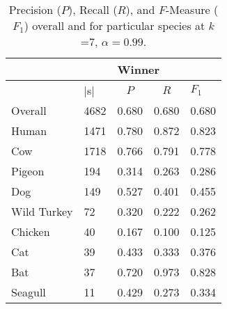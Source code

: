 \begin{table}[t]
\caption{Precision ($P$), Recall ($R$), and $F$-Measure ($F_1$) overall and for particular species at $k$=7, $\alpha=0.99$.}
\label{tab:profile099}
\begin{tabular}{lllll}
\cline{3-5}
                                  & \multicolumn{1}{l|}{}           & \multicolumn{3}{l|}{Winner}                \\ \hline
\multicolumn{1}{|l|}{\Spec{}} & \multicolumn{1}{l|}{$|$\Isol{}s$|$} & \multicolumn{1}{c|}{$P$}   & \multicolumn{1}{c|}{$R$}   & \multicolumn{1}{l|}{$F_1$} \\ \hline
\multicolumn{1}{|l|}{Overall}     & \multicolumn{1}{l|}{4682}            & 0.680 & 0.680 & \multicolumn{1}{l|}{0.680} \\
\multicolumn{1}{|l|}{Human}       & \multicolumn{1}{l|}{1471}            & 0.780 & 0.872 & \multicolumn{1}{l|}{0.823} \\
\multicolumn{1}{|l|}{Cow}         & \multicolumn{1}{l|}{1718}            & 0.766 & 0.791 & \multicolumn{1}{l|}{0.778} \\
\multicolumn{1}{|l|}{Pigeon}      & \multicolumn{1}{l|}{194}             & 0.314 & 0.263 & \multicolumn{1}{l|}{0.286} \\
\multicolumn{1}{|l|}{Dog}         & \multicolumn{1}{l|}{149}             & 0.527 & 0.401 & \multicolumn{1}{l|}{0.455} \\
\multicolumn{1}{|l|}{Wild Turkey} & \multicolumn{1}{l|}{72}              & 0.320 & 0.222 & \multicolumn{1}{l|}{0.262} \\
\multicolumn{1}{|l|}{Chicken}     & \multicolumn{1}{l|}{40}              & 0.167 & 0.100 & \multicolumn{1}{l|}{0.125} \\
\multicolumn{1}{|l|}{Cat}         & \multicolumn{1}{l|}{39}              & 0.433 & 0.333 & \multicolumn{1}{l|}{0.376} \\
\multicolumn{1}{|l|}{Bat}         & \multicolumn{1}{l|}{37}              & 0.720 & 0.973 & \multicolumn{1}{l|}{0.828} \\
\multicolumn{1}{|l|}{Seagull}     & \multicolumn{1}{l|}{11}              & 0.429 & 0.273 & \multicolumn{1}{l|}{0.334} \\ \hline
\end{tabular}



\end{table}
